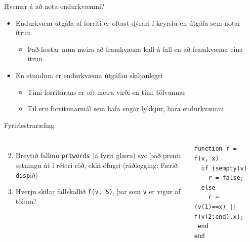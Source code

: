 \documentclass{beamer}
\begin{document}
\begin{frame}{Hvenær á að nota endurkvæmni?}
\begin{itemize}
 \item Endurkvæm útgáfa af forriti er oftast dýrari í keyrslu en útgáfa sem notar ítrun
 \begin{itemize}
  \item Það kostar mun meira að framkvæma kall á fall en að framkvæma eina ítrun
 \end{itemize}
 \item En stundum er endurkvæma útgáfan skiljanlegri
 \begin{itemize}
  \item Tími forritarans er oft meira virði en tími tölvunnar
  \item Til eru forritunarmál sem hafa engar lykkjur, bara endurkvæmni
 \end{itemize}
\end{itemize}
\end{frame}




\begin{frame}[fragile]{Fyrirlestraræfing}
\begin{columns}
\begin{enumerate}
 \setcounter{enumi}{1}
 \item Breytið fallinu \texttt{prtwords} (á fyrri glæru) svo það prenti setningu út í réttri röð, ekki öfugri (ráðlegging: Færið \texttt{disp}ið)
 \item Hverju skilar fallskallið \texttt{f(v, 5)}, þar sem \texttt{v} er vigur af tölum?
\end{enumerate}

\begin{verbatim}
function r = f(v, x)
  if isempty(v)
    r = false;
  else
    r = (v(1)==x) || f(v(2:end),x);
 end
end
\end{verbatim}

\end{columns}
\end{frame}
\end{document}
